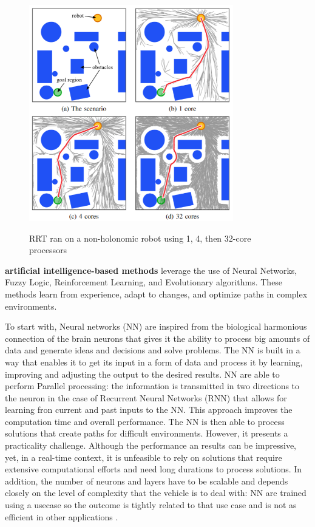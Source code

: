 \begin{figure}[H]
    \begin{center}
       \includegraphics[width=3.5in]{images/Chap1/sampling-based.png}\\
       \caption{RRT ran on a non-holonomic robot using 1, 4, then 32-core 
       processors \cite{R16}}
       \label{sampling-based}
       \end{center}
\end{figure}

\textbf{artificial intelligence-based methods} 
leverage the use of Neural Networks, Fuzzy Logic, Reinforcement Learning, and Evolutionary algorithms. 
These methods learn from experience, adapt to changes, and optimize paths in complex environments. 


To start with, Neural networks (NN) are inspired from the biological harmonious connection of the brain neurons
that gives it the ability to process big amounts of data and generate ideas and decisions and solve problems. 
The NN is built in a way that enables it to get its input in a form of data and process it by learning, improving 
and adjusting the output to the desired results. NN are able to perform Parallel processing: the information is 
transmitted in two
directions to the neuron in the case of Recurrent Neural Networks (RNN) that allows for learning fron current and 
past inputs to the NN. This approach improves the computation time and overall performance. 
The NN is then able to process solutions that create paths for difficult environments. 
However, it presents a practicality challenge. Although the performance an results can be impressive, yet, in a 
real-time context, 
it is unfeasible to rely on solutions that require extensive computational efforts and need long durations to 
process solutions. In addition, the number of neurons and layers have to be scalable and depends closely on the 
level of complexity that the vehicle is to deal with: NN are trained using a usecase so the 
outcome is tightly related to that use case and is not as efficient in other applications \cite{R12}. 

